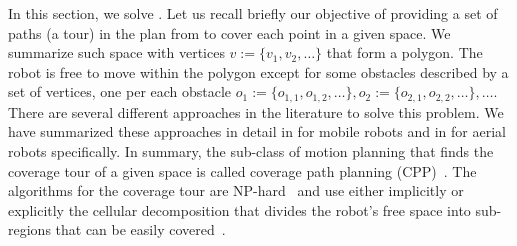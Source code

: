 In this section, we solve . Let us recall briefly our objective of providing a set of paths (a tour) in the plan from  to cover each point in a given space. We summarize such space with vertices $v:=\{v_1,v_2,\dots\}$ that form a polygon. The robot is free to move within the polygon except for some obstacles described by a set of vertices, one per each obstacle $o_1:=\{o_{1,1},o_{1,2},\dots\},o_2:=\{o_{2,1},o_{2,2},\dots\},\dots$. There are several different approaches in the literature to solve this problem. We have summarized these approaches in detail in  for mobile robots and in  for aerial robots specifically. In summary, the sub-class of motion planning that finds the coverage tour of a given space is called coverage path planning (CPP)~\citep{choset1998coverage}. The algorithms for the coverage tour are NP-hard~\citep{arkin2000approximation} and use either implicitly or explicitly the cellular decomposition that divides the robot's free space into sub-regions that can be easily covered~\citep{choset2001coverage,galceran2013survey}.

